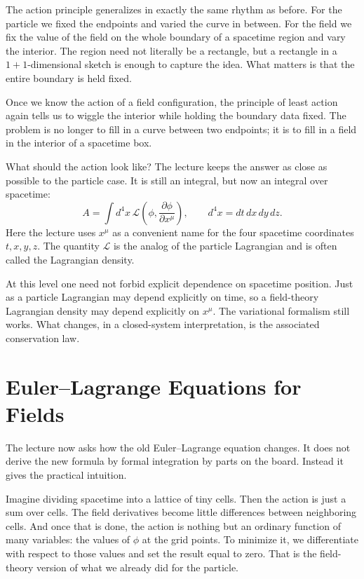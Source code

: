 The action principle generalizes in exactly the same rhythm as before. For the particle we fixed the endpoints and varied the curve in between. For the field we fix the value of the field on the whole boundary of a spacetime region and vary the interior. The region need not literally be a rectangle, but a rectangle in a \(1+1\)-dimensional sketch is enough to capture the idea. What matters is that the entire boundary is held fixed.

Once we know the action of a field configuration, the principle of least action again tells us to wiggle the interior while holding the boundary data fixed. The problem is no longer to fill in a curve between two endpoints; it is to fill in a field in the interior of a spacetime box.

What should the action look like? The lecture keeps the answer as close as possible to the particle case. It is still an integral, but now an integral over spacetime:
\begin{equation}
A=\int d^4x\,\mathcal{L}\!\left(\phi,\frac{\partial\phi}{\partial x^\mu}\right),
\qquad
d^4x=dt\,dx\,dy\,dz.
\end{equation}
Here the lecture uses \(x^\mu\) as a convenient name for the four spacetime coordinates \(t,x,y,z\). The quantity \(\mathcal{L}\) is the analog of the particle Lagrangian and is often called the Lagrangian density.

At this level one need not forbid explicit dependence on spacetime position. Just as a particle Lagrangian may depend explicitly on time, so a field-theory Lagrangian density may depend explicitly on \(x^\mu\). The variational formalism still works. What changes, in a closed-system interpretation, is the associated conservation law.

\section{Euler--Lagrange Equations for Fields}

The lecture now asks how the old Euler--Lagrange equation changes. It does not derive the new formula by formal integration by parts on the board. Instead it gives the practical intuition.

Imagine dividing spacetime into a lattice of tiny cells. Then the action is just a sum over cells. The field derivatives become little differences between neighboring cells. And once that is done, the action is nothing but an ordinary function of many variables: the values of \(\phi\) at the grid points. To minimize it, we differentiate with respect to those values and set the result equal to zero. That is the field-theory version of what we already did for the particle.

